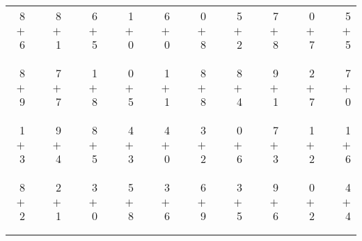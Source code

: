 \documentclass[12pt, letterpaper]{article}
\begin{document}
\begin{tabular}{rrrrrrrrrrrrrrrrrrr}
8 & & 8 & & 6 & & 1 & & 6 & & 0 & & 5 & & 7 & & 0 & & 5\\
$+$ 6 & & $+$ 1 & & $+$ 5 & & $+$ 0 & & $+$ 0 & & $+$ 8 & & $+$ 2 & & $+$ 8 & & $+$ 7 & & $+$ 5\\
\cline{1-1} \cline{3-3} \cline{5-5} \cline{7-7} \cline{9-9} \cline{11-11} \cline{13-13} \cline{15-15} \cline{17-17} \cline{19-19} \\ \\
8 & & 7 & & 1 & & 0 & & 1 & & 8 & & 8 & & 9 & & 2 & & 7\\
$+$ 9 & & $+$ 7 & & $+$ 8 & & $+$ 5 & & $+$ 1 & & $+$ 8 & & $+$ 4 & & $+$ 1 & & $+$ 7 & & $+$ 0\\
\cline{1-1} \cline{3-3} \cline{5-5} \cline{7-7} \cline{9-9} \cline{11-11} \cline{13-13} \cline{15-15} \cline{17-17} \cline{19-19} \\ \\
1 & & 9 & & 8 & & 4 & & 4 & & 3 & & 0 & & 7 & & 1 & & 1\\
$+$ 3 & & $+$ 4 & & $+$ 5 & & $+$ 3 & & $+$ 0 & & $+$ 2 & & $+$ 6 & & $+$ 3 & & $+$ 2 & & $+$ 6\\
\cline{1-1} \cline{3-3} \cline{5-5} \cline{7-7} \cline{9-9} \cline{11-11} \cline{13-13} \cline{15-15} \cline{17-17} \cline{19-19} \\ \\
8 & & 2 & & 3 & & 5 & & 3 & & 6 & & 3 & & 9 & & 0 & & 4\\
$+$ 2 & & $+$ 1 & & $+$ 0 & & $+$ 8 & & $+$ 6 & & $+$ 9 & & $+$ 5 & & $+$ 6 & & $+$ 2 & & $+$ 4\\
\cline{1-1} \cline{3-3} \cline{5-5} \cline{7-7} \cline{9-9} \cline{11-11} \cline{13-13} \cline{15-15} \cline{17-17} \cline{19-19} \\ \\
\end{tabular}
\newpage
\end{document}

